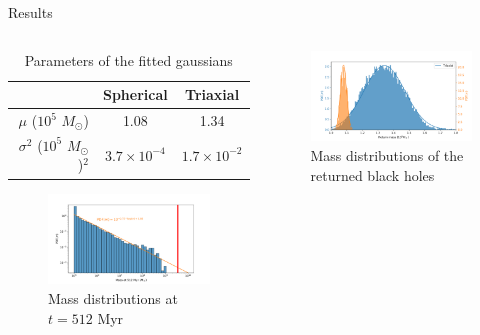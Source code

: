 \documentclass{beamer}
\newcommand{\sm}[0]{$M_\odot$}
\begin{document}
\begin{frame}{Results}
	\begin{columns}
		\begin{column}{0.5\textwidth}
			\begin{table}[h]
				\centering
				\caption{\small Parameters of the fitted gaussians}
				\tiny
				\begin{tabular}{r|cc}
					\hline
					& \textbf{Spherical} & \textbf{Triaxial} \\
					\hline
					$\mu$ ($10^5$ \sm) & 1.08 & 1.34 \\
					$\sigma^2$ ($10^5$ \sm)$^2$ & $3.7\times10^{-4}$ & $1.7\times10^{-2}$\\
					\hline
				\end{tabular}
				\label{tb: gaussians}
			\end{table}
			\begin{figure}[h]
				\centering
				\includegraphics[width=0.95\linewidth]{"../Files/Week 14/masses_at"}
				\caption{\small Mass distributions at $t = 512$ Myr}
				\label{fig: massDistAt}
			\end{figure}
			\vspace{2.5cm}
			
		\end{column}
		\begin{column}{0.5\textwidth}
			\begin{figure}[h]
				\centering
				\includegraphics[width=\linewidth]{"../Files/Week 14/dist_masses"}
				\caption{Mass distributions of the returned black holes}
				\label{fig: massDist}
			\end{figure}
			\vspace{2.5cm}
						
		\end{column}
	\end{columns}
\end{frame}
\end{document}
